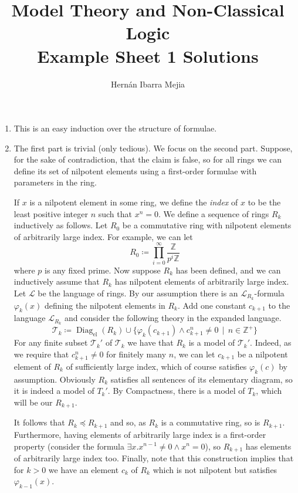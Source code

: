 \documentclass{article}
\DeclareMathOperator{\Diag}{Diag}
\begin{document}
	\title{Model Theory and Non-Classical Logic\\ Example Sheet 1 Solutions}
	\author{Hernán Ibarra Mejia}
	\maketitle
	\begin{enumerate}[leftmargin=*]
		\item This is an easy induction over the structure of formulae.
		\item The first part is trivial (only tedious). We focus on the second part. Suppose, for the sake of contradiction, that the claim is false, so for all rings we can define its set of nilpotent elements using a first-order formulae with parameters in the ring.
		
		If $x$ is a nilpotent element in some ring, we define the \emph{index} of $x$ to be the least positive integer $n$ such that $x^n = 0$. We define a sequence of rings $R_{k}$ inductively as follows. Let $R_0$ be a commutative ring with nilpotent elements of arbitrarily large index. For example, we can let
		\[
			R_0 \coloneqq \prod_{i=0}^{\infty} \frac{\mathbb{Z}}{p^{i}\mathbb{Z}}
		\]
		where $p$ is any fixed prime. Now suppose $R_k$ has been defined, and we can inductively assume that $R_k$ has nilpotent elements of arbitrarily large index. Let $\mathcal{L}$ be the language of rings. By our assumption there is an $\mathcal{L}_{R_k}$-formula $\varphi_k(x)$ defining the nilpotent elements in $R_k$. Add one constant $c_{k+1}$ to the language $\mathcal{L}_{R_k}$ and consider the following theory in the expanded language. 
		\[
			\mathcal{T}_k \coloneqq \Diag_{\text{el}}(R_k) \cup \{\varphi_k(c_{k+1}) \wedge c_{k+1}^n \neq 0\,\mid\, n\in\mathbb{Z}^+\}
		\]
		For any finite subset $\mathcal{T}_k'$ of $\mathcal{T}_k$ we have that $R_k$ is a model of $\mathcal{T}_k'$. Indeed, as we require that $c_{k+1}^n\neq 0$ for finitely many $n$, we can let $c_{k+1}$ be a nilpotent element of $R_k$ of sufficiently large index, which of course satisfies $\varphi_k(c)$ by assumption. Obviously $R_k$ satisfies all sentences of its elementary diagram, so it is indeed a model of $T_k'$. By Compactness, there is a model of $T_k$, which will be our $R_{k+1}$. 
		
		It follows that $R_k \preccurlyeq R_{k+1}$ and so, as $R_k$ is a commutative ring, so is $R_{k+1}$. Furthermore, having elements of arbitrarily large index is a first-order property (consider the formula $\exists x. x^{n-1} \neq 0 \wedge x^n = 0$), so $R_{k+1}$ has elements of arbitrarily large index too. Finally, note that this construction implies that for $k>0$ we have an element $c_k$ of $R_k$ which is not nilpotent but satisfies $\varphi_{k-1}(x)$.
		

\end{enumerate}
\end{document}
